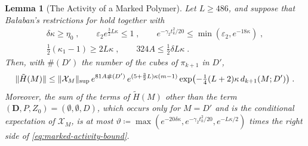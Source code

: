 \documentclass[11pt]{preprint}
\DeclarePairedDelimiter{\norm}{\lVert}{\rVert}
\numberwithin{equation}{section}
\newtheorem{lemma}{Lemma}[section]
\theoremstyle{definition}
\theoremstyle{remark}
\theoremstyle{plain}
\begin{document}
\begin{lemma}[The Activity of a Marked Polymer]\label{lem:marked-activity}
Let $L \geq 486$, and suppose that Ba{\l}aban's restrictions for \cite[(2.26)]{BalabanRG2} hold together with
\begin{equation}\label{eq:marked-conditions}
\begin{gathered}
    \delta\kappa \geq \eta_0\;,
    \qquad
    \varepsilon_2e^{\frac32L\kappa} \leq 1\;,
    \qquad
    e^{-\gamma_2t_k^2/20} \leq \min(\varepsilon_2, e^{-18\kappa})\;,\\
    \tfrac12(\kappa_1 - 1) \geq 2L\kappa\;,
    \qquad
    324A \leq \tfrac12\delta L\kappa\;.
\end{gathered}
\end{equation}
Then, with $\#(D')$ the number of the cubes of $\pi_{k+1}$ in $D'$,
\begin{equation}\label{eq:marked-activity-bound}
    \norm{\tilde H(M)} \leq \norm{\mathcal X_M}_{\sup}\,e^{81A\#(D')}\,e^{(5 + \frac32L)\kappa(m - 1)}\exp\bigl(-\tfrac14(L + 2)\kappa\,d_{k+1}(M; D')\bigr)\;.
\end{equation}
Moreover, the sum of the terms of $\tilde H(M)$ other than the term $(\mathbf D, P, Z_0) = (\emptyset, \emptyset, D)$, which occurs only for $M = D'$ and is the conditional expectation of $\mathcal X_M$, is at most $\vartheta \coloneqq \max(e^{-20\delta\kappa}, e^{-\gamma_2t_k^2/20}, e^{-L\kappa/2})$ times the right side of \eqref{eq:marked-activity-bound}.
\end{lemma}
\end{document}
